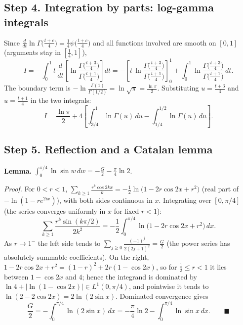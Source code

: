 \documentclass[11pt]{article}
\theoremstyle{remark}
\begin{document}
\subsection*{Step 4. Integration by parts: log-gamma integrals}

Since $\frac{d}{dt}\ln\Gamma\bigl(\frac{t+c}{4}\bigr)=\frac14\psi\bigl(\frac{t+c}{4}\bigr)$ and all functions involved are smooth on $[0,1]$ (arguments stay in $[\tfrac14,1]$),
$$
I=-\int_0^1 t\,\frac{d}{dt}\!\left[\ln\frac{\Gamma\bigl(\frac{t+3}{4}\bigr)}{\Gamma\bigl(\frac{t+1}{4}\bigr)}\right]dt
=-\left[t\,\ln\frac{\Gamma\bigl(\frac{t+3}{4}\bigr)}{\Gamma\bigl(\frac{t+1}{4}\bigr)}\right]_0^1
+\int_0^1 \ln\frac{\Gamma\bigl(\frac{t+3}{4}\bigr)}{\Gamma\bigl(\frac{t+1}{4}\bigr)}\,dt .
$$
The boundary term is $-\ln\frac{\Gamma(1)}{\Gamma(1/2)}=\ln\sqrt\pi=\frac{\ln\pi}{2}$. Substituting $u=\frac{t+3}{4}$ and $u=\frac{t+1}{4}$ in the two integrals:
\begin{equation*}
I=\frac{\ln\pi}{2}+4\left[\int_{3/4}^{1}\ln\Gamma(u)\,du-\int_{1/4}^{1/2}\ln\Gamma(u)\,du\right].
\tag{4}
\end{equation*}

\subsection*{Step 5. Reflection and a Catalan lemma}

\textbf{Lemma.} $\displaystyle\int_0^{\pi/4}\ln\sin w\,dw=-\frac{G}{2}-\frac{\pi}{4}\ln 2$.

\emph{Proof.} For $0<r<1$, $\sum_{k\ge1}\frac{r^{k}\cos 2kx}{k}=-\frac12\ln\bigl(1-2r\cos 2x+r^{2}\bigr)$ (real part of $-\ln(1-re^{2ix})$), with both sides continuous in $x$. Integrating over $[0,\pi/4]$ (the series converges uniformly in $x$ for fixed $r<1$):
$$
\sum_{k\ge1}\frac{r^{k}\sin(k\pi/2)}{2k^{2}}=-\frac12\int_0^{\pi/4}\ln\bigl(1-2r\cos 2x+r^{2}\bigr)\,dx .
$$
As $r\to1^-$ the left side tends to $\sum_{j\ge0}\frac{(-1)^{j}}{2(2j+1)^{2}}=\frac{G}{2}$ (the power series has absolutely summable coefficients). On the right, $1-2r\cos2x+r^{2}=(1-r)^{2}+2r(1-\cos 2x)$, so for $\tfrac12\le r<1$ it lies between $1-\cos 2x$ and $4$; hence the integrand is dominated by $\ln 4+\bigl|\ln(1-\cos 2x)\bigr|\in L^{1}(0,\pi/4)$, and pointwise it tends to $\ln(2-2\cos2x)=2\ln(2\sin x)$. Dominated convergence gives
$$
\frac{G}{2}=-\int_0^{\pi/4}\ln(2\sin x)\,dx=-\frac{\pi}{4}\ln 2-\int_0^{\pi/4}\ln\sin x\,dx . \qquad\blacksquare
$$
\end{document}

